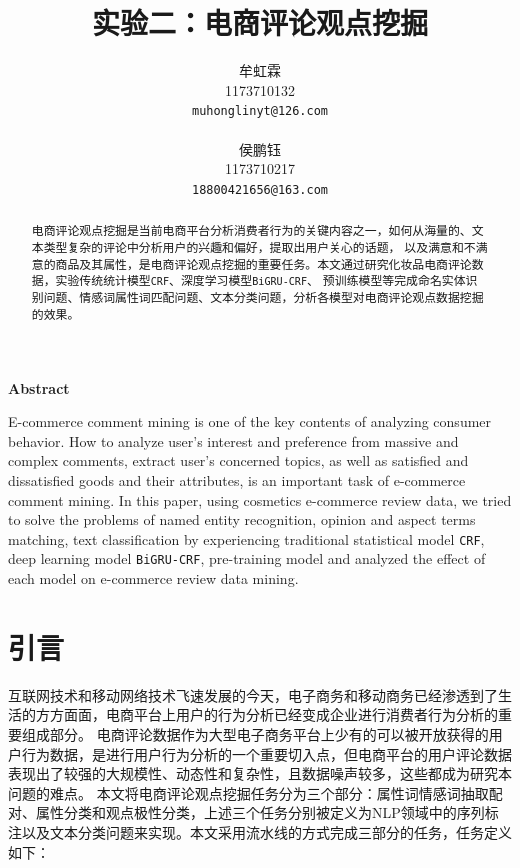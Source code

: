 \documentclass[11pt,a4paper]{article}
\title{实验二：电商评论观点挖掘}
\author{
  牟虹霖 \\
  1173710132 \\
  \texttt{muhonglinyt@126.com} \\
  \\\And
  侯鹏钰 \\
  1173710217 \\
  \texttt{18800421656@163.com} \\
}
\date{}
\begin{document}
\maketitle
\begin{abstract}
  电商评论观点挖掘是当前电商平台分析消费者行为的关键内容之一，如何从海量的、文本类型复杂的评论中分析用户的兴趣和偏好，提取出用户关心的话题，
  以及满意和不满意的商品及其属性，是电商评论观点挖掘的重要任务。本文通过研究化妆品电商评论数据，实验传统统计模型\texttt{CRF}、深度学习模型\texttt{BiGRU-CRF}、
  预训练模型等完成命名实体识别问题、情感词属性词匹配问题、文本分类问题，分析各模型对电商评论观点数据挖掘的效果。

\end{abstract}

\begin{center}
  \large{\textbf{Abstract}}
\end{center}

\begin{adjustwidth}{0.6cm}{0.6cm}
  \fontsize{10pt}{12pt}
  E-commerce comment mining is one of the key contents of analyzing consumer behavior. 
  How to analyze user's interest and preference from massive and complex comments, extract user's concerned topics, 
  as well as satisfied and dissatisfied goods and their attributes, is an important task of e-commerce comment mining. 
  In this paper, using cosmetics e-commerce review data, we tried to solve the problems of named entity recognition, 
  opinion and aspect terms matching, text classification by experiencing traditional statistical model \texttt{CRF}, 
  deep learning model \texttt{BiGRU-CRF}, pre-training model and analyzed the effect of each model on e-commerce review data mining.
\end{adjustwidth}


\section{引言}
互联网技术和移动网络技术飞速发展的今天，电子商务和移动商务已经渗透到了生活的方方面面，电商平台上用户的行为分析已经变成企业进行消费者行为分析的重要组成部分。
电商评论数据作为大型电子商务平台上少有的可以被开放获得的用户行为数据，是进行用户行为分析的一个重要切入点，但电商平台的用户评论数据表现出了较强的大规模性、动态性和复杂性，且数据噪声较多，这些都成为研究本问题的难点。
本文将电商评论观点挖掘任务分为三个部分：属性词情感词抽取配对、属性分类和观点极性分类，上述三个任务分别被定义为NLP领域中的序列标注以及文本分类问题来实现。本文采用流水线的方式完成三部分的任务，任务定义如下：
\end{document}
